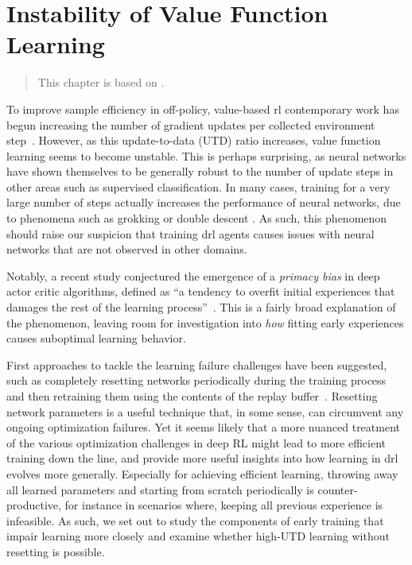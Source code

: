 \chapter{Instability of Value Function Learning}
\label{chap:overestimation}

\begin{quote}
    This chapter is based on .
\end{quote}

To improve sample efficiency in off-policy, value-based \ac{rl} contemporary work has begun increasing the number of gradient updates per collected environment step~\parencite{janner2019mbpo,fedus2020revisiting,chen2021randomized, hiraoka2022dropout, nikishin2022primacy, doro2023barrier, schwarzer2023bigger, kim2023resetensemble}.  
However, as this update-to-data (UTD) ratio increases, value function learning seems to become unstable.
This is perhaps surprising, as neural networks have shown themselves to be generally robust to the number of update steps in other areas such as supervised classification.
In many cases, training for a very large number of steps actually increases the performance of neural networks, due to phenomena such as grokking \parencite{power2022grokking} or double descent \parencite{belkin2019reconciling}.
As such, this phenomenon should raise our suspicion that training \ac{drl} agents causes issues with neural networks that are not observed in other domains.

Notably, a recent study conjectured the emergence of a \emph{primacy bias} in deep actor critic algorithms, defined as ``a tendency to overfit initial experiences that damages the rest of the learning process''~\parencite{nikishin2022primacy}. 
This is a fairly broad explanation of the phenomenon, leaving room for investigation into \emph{how} fitting early experiences causes suboptimal learning behavior.

First approaches to tackle the learning failure challenges have been suggested, such as completely resetting networks periodically during the training process and then retraining them using the contents of the replay buffer~\parencite{nikishin2022primacy, doro2023barrier}. 
Resetting network parameters is a useful technique that, in some sense, can circumvent any ongoing optimization failures. 
Yet it seems likely that a more nuanced treatment of the various optimization challenges in deep RL might lead to more efficient training down the line, and provide more useful insights into how learning in \ac{drl} evolves more generally. 
Especially for achieving efficient learning, throwing away all learned parameters and starting from scratch periodically is counter-productive, for instance in scenarios where, keeping all previous experience is infeasible. %
As such, we set out to study the components of early training that impair learning more closely and examine whether high-UTD learning without resetting is possible.


